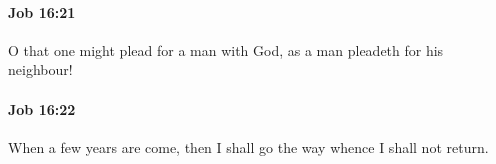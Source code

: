 		\paragraph{Job 16:21} %
			\label{JOB-16-21}

			O that one might plead for a man with God, as a man pleadeth for his neighbour!


		\paragraph{Job 16:22} %
			\label{JOB-16-22}

			When a few years are come, then I shall go the way whence I shall not return.

